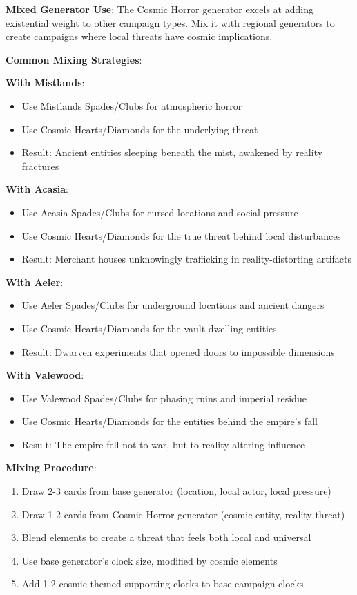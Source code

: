 \documentclass[11pt]{article}
\begin{document}
\begin{mdframed}[backgroundcolor=tableheader]
\textbf{Mixed Generator Use}:
The Cosmic Horror generator excels at adding existential weight to other campaign types. Mix it with regional generators to create campaigns where local threats have cosmic implications.

\textbf{Common Mixing Strategies}:

\textbf{With Mistlands}:
\begin{itemize}[leftmargin=*]
\item Use Mistlands Spades/Clubs for atmospheric horror
\item Use Cosmic Hearts/Diamonds for the underlying threat
\item Result: Ancient entities sleeping beneath the mist, awakened by reality fractures
\end{itemize}

\textbf{With Acasia}:
\begin{itemize}[leftmargin=*]
\item Use Acasia Spades/Clubs for cursed locations and social pressure
\item Use Cosmic Hearts/Diamonds for the true threat behind local disturbances
\item Result: Merchant houses unknowingly trafficking in reality-distorting artifacts
\end{itemize}

\textbf{With Aeler}:
\begin{itemize}[leftmargin=*]
\item Use Aeler Spades/Clubs for underground locations and ancient dangers
\item Use Cosmic Hearts/Diamonds for the vault-dwelling entities
\item Result: Dwarven experiments that opened doors to impossible dimensions
\end{itemize}

\textbf{With Valewood}:
\begin{itemize}[leftmargin=*]
\item Use Valewood Spades/Clubs for phasing ruins and imperial residue
\item Use Cosmic Hearts/Diamonds for the entities behind the empire's fall
\item Result: The empire fell not to war, but to reality-altering influence
\end{itemize}

\textbf{Mixing Procedure}:
\begin{enumerate}[leftmargin=*]
\item Draw 2-3 cards from base generator (location, local actor, local pressure)
\item Draw 1-2 cards from Cosmic Horror generator (cosmic entity, reality threat)
\item Blend elements to create a threat that feels both local and universal
\item Use base generator's clock size, modified by cosmic elements
\item Add 1-2 cosmic-themed supporting clocks to base campaign clocks
\end{enumerate}
\end{mdframed}
\end{document}
